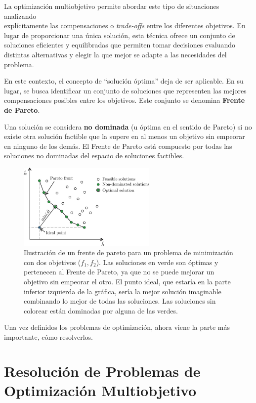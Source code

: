 \documentclass[12pt,a4paper]{book}
\begin{document}
La optimización multiobjetivo permite abordar este tipo de situaciones analizando\\
explícitamente las compensaciones o \textit{trade-offs} entre los diferentes objetivos. En lugar de proporcionar una única solución, esta técnica ofrece un conjunto de soluciones eficientes y equilibradas que permiten
tomar decisiones evaluando distintas alternativas y elegir la que mejor se adapte a las necesidades del problema.

En este contexto, el concepto de “solución óptima” deja de ser aplicable. En su lugar, se busca identificar un conjunto de soluciones que representen las mejores compensaciones posibles entre los objetivos. Este conjunto se denomina \textbf{Frente de Pareto}.

Una solución se considera \textbf{no dominada} (u óptima en el sentido de Pareto) si no existe otra solución factible que la supere en al menos un objetivo sin empeorar en ninguno de los demás. El Frente de Pareto está compuesto por todas las soluciones no dominadas del espacio de soluciones factibles.
\begin{figure}[H]
    \centering
    \includegraphics[width=0.6\textwidth]{images/pareto_front.png}
    \caption{\cite{Bre2017} Ilustración de un frente de pareto para un problema de minimización con dos objetivos ($f_1, f_2$). Las soluciones en verde son óptimas y pertenecen al Frente de Pareto, ya que no se puede mejorar un objetivo sin empeorar el otro. El punto ideal, que estaría en la parte inferior izquierda de la gráfica, sería la mejor solución imaginable combinando lo mejor de todas las soluciones. Las soluciones sin colorear están dominadas por alguna de las verdes.}
    \label{fig:pareto}
\end{figure}

Una vez definidos los problemas de optimización, ahora viene la parte más importante, cómo resolverlos.

\section{Resolución de Problemas de Optimización Multiobjetivo}
\end{document}
